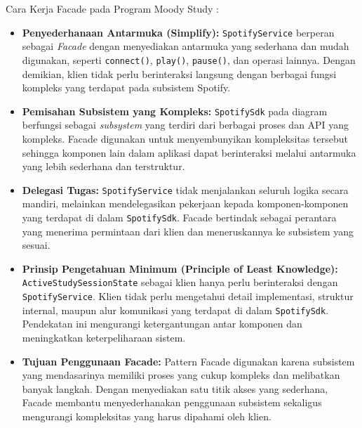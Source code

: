 \documentclass[11pt]{article}
\begin{document}
Cara Kerja Facade pada Program Moody Study :
\begin{itemize}

\item \textbf{Penyederhanaan Antarmuka (Simplify):} \texttt{SpotifyService} berperan sebagai \textit{Facade} dengan menyediakan antarmuka yang sederhana dan mudah digunakan, seperti \texttt{connect()}, \texttt{play()}, \texttt{pause()}, dan operasi lainnya. Dengan demikian, klien tidak perlu berinteraksi langsung dengan berbagai fungsi kompleks yang terdapat pada subsistem Spotify.

\item \textbf{Pemisahan Subsistem yang Kompleks:} \texttt{SpotifySdk} pada diagram berfungsi sebagai \textit{subsystem} yang terdiri dari berbagai proses dan API yang kompleks. Facade digunakan untuk menyembunyikan kompleksitas tersebut sehingga komponen lain dalam aplikasi dapat berinteraksi melalui antarmuka yang lebih sederhana dan terstruktur.

\item \textbf{Delegasi Tugas:} \texttt{SpotifyService} tidak menjalankan seluruh logika secara mandiri, melainkan mendelegasikan pekerjaan kepada komponen-komponen yang terdapat di dalam \texttt{SpotifySdk}. Facade bertindak sebagai perantara yang menerima permintaan dari klien dan meneruskannya ke subsistem yang sesuai.

\item \textbf{Prinsip Pengetahuan Minimum (Principle of Least Knowledge):} \texttt{ActiveStudySessionState} sebagai klien hanya perlu berinteraksi dengan \texttt{SpotifyService}. Klien tidak perlu mengetahui detail implementasi, struktur internal, maupun alur komunikasi yang terdapat di dalam \texttt{SpotifySdk}. Pendekatan ini mengurangi ketergantungan antar komponen dan meningkatkan keterpeliharaan sistem.

\item \textbf{Tujuan Penggunaan Facade:} Pattern Facade digunakan karena subsistem yang mendasarinya memiliki proses yang cukup kompleks dan melibatkan banyak langkah. Dengan menyediakan satu titik akses yang sederhana, Facade membantu menyederhanakan penggunaan subsistem sekaligus mengurangi kompleksitas yang harus dipahami oleh klien.

\end{itemize}
\end{document}
